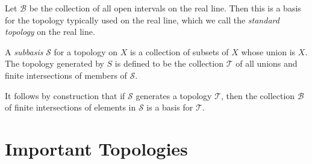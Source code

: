 \begin{example}
Let $\mathcal{B}$ be the collection of all open intervals on the real line.
Then this is a basis for the topology typically used on the real line,
which we call the \emph{standard topology} on the real line.
\end{example}
\begin{definition}
\label{def:sub-basis}
A \emph{subbasis} $\mathcal{S}$ for a topology on $X$ is a collection of subsets of
$X$ whose union is $X$. The topology generated by $S$ is defined to be
the collection $\mathcal{T}$ of all unions and finite intersections of members
of $\mathcal{S}$.
\end{definition}
It follows by construction that if $\mathcal{S}$ generates a topology
$\mathcal{T}$, then the collection $\mathcal{B}$ of finite
intersections of elements in $\mathcal{S}$ is a basis for $\mathcal{T}$.
\section{Important Topologies}
